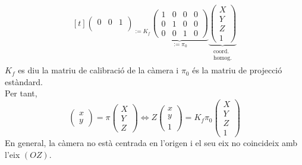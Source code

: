 \documentclass[a4paper,12pt]{article}
\begin{document}
\begin{displaymath}
\begin{aligned}[t]
{\begin{pmatrix}
				0 & 0 & 1\\
				\end{pmatrix}}_{:= K_f}
				\underbrace{\begin{pmatrix}
				1 & 0 & 0 & 0\\
				0 & 1 & 0 & 0\\
				0 & 0 & 1 & 0
				\end{pmatrix}}_{:= \pi_0}
				\underbrace{\begin{pmatrix}
				X\\Y\\Z\\1
				\end{pmatrix}}_{\substack{\text{coord.}\\ \text{homog.}}}
		\end{aligned}
	\end{displaymath}
	$K_f$ es diu la matriu de calibració de la càmera i $\pi_0$ és la matriu de projecció estàndard.\\
	Per tant,
	\begin{displaymath}
		\begin{pmatrix}
			x\\y
		\end{pmatrix} = \pi\begin{pmatrix}
			X\\Y\\Z
		\end{pmatrix} \iff Z\begin{pmatrix}
			x\\y\\1
		\end{pmatrix} = K_f\pi_0\begin{pmatrix}
			X\\Y\\Z\\1
		\end{pmatrix}
	\end{displaymath}
	En general, la càmera no està centrada en l'origen i el seu eix no coincideix amb l'eix $(OZ)$.\\
\end{document}
